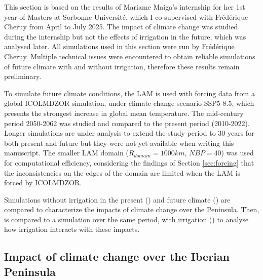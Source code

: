 This section is based on the results of Mariame Maiga's internship for her 1st year of Masters at Sorbonne Université, which I co-supervised with Frédérique Cheruy from April to July 2025. The impact of climate change was studied during the internship but not the effects of irrigation in the future, which was analysed later. All simulations used in this section were run by Frédérique Cheruy. 
Multiple technical issues were encountered to obtain reliable simulations of future climate with and without irrigation, therefore these results remain preliminary.

\hfill

To simulate future climate conditions, the LAM is used with forcing data from a global ICOLMDZOR simulation, under climate change scenario SSP5-8.5, which presents the strongest increase in global mean temperature. The mid-century period 2050-2062 was studied and compared to the present period (2010-2022). Longer simulations are under analysis to extend the study period to 30 years for both present and future but they were not yet available when writing this manuscript.
The smaller LAM domain ($R_{domain} = 1000 km$, $NBP=40$) was used for computational efficiency, considering the findings of Section \ref{sec:forcing} that the inconsistencies on the edges of the domain are limited when the LAM is forced by ICOLMDZOR.

Simulations without irrigation in the present (\presnoirr) and future climate (\futnoirr) are compared to characterize the impacts of climate change over the Peninsula. Then, \futnoirr is compared to a simulation over the same period, with irrigation (\futirr) to analyse how irrigation interacts with these impacts.

\subsection{Impact of climate change over the Iberian Peninsula}

